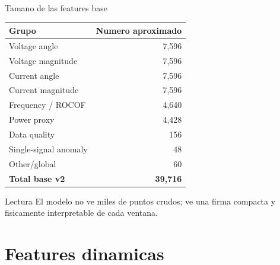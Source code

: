 \documentclass[10pt,aspectratio=169]{beamer}
\begin{document}
\begin{frame}{Tamano de las features base}
\small
\centering
\begin{tabular}{lr}
\toprule
\textbf{Grupo} & \textbf{Numero aproximado}\\
\midrule
Voltage angle & 7,596\\
Voltage magnitude & 7,596\\
Current angle & 7,596\\
Current magnitude & 7,596\\
Frequency / ROCOF & 4,640\\
Power proxy & 4,428\\
Data quality & 156\\
Single-signal anomaly & 48\\
Other/global & 60\\
\midrule
\textbf{Total base v2} & \textbf{39,716}\\
\bottomrule
\end{tabular}
\vspace{3mm}
\begin{block}{Lectura}
El modelo no ve miles de puntos crudos; ve una firma compacta y fisicamente interpretable de cada ventana.
\end{block}
\end{frame}

\section{Features dinamicas}
\end{document}
